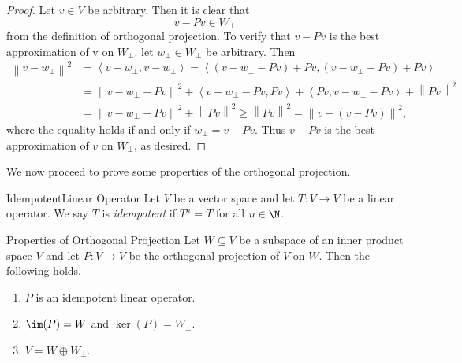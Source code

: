 \documentclass[linearalgebraII]{subfiles}
\begin{document}
    \begin{proof}
        Let $v\in V$ be arbitrary. Then it is clear that
        \begin{equation*}
            v - Pv \in W_\perp 
        \end{equation*}
        from the definition of orthogonal projection. To verify that $v-Pv$ is the best approximation of v on $W_\perp$. let $w_\perp\in W_\perp$ be arbitrary. Then
        \begin{align*}
            \left\lVert v-w_\perp\right\rVert ^2 & = \left\langle v-w_\perp, v-w_\perp\right\rangle = \left\langle \left( v-w_\perp-Pv \right) + Pv, \left( v-w_\perp-Pv \right) + Pv\right\rangle \\
                                                 & = \left\lVert v-w_\perp-Pv\right\rVert ^2 + \left\langle v-w_\perp-Pv, Pv\right\rangle + \left\langle Pv, v-w_\perp-Pv\right\rangle + \left\lVert Pv\right\rVert ^2 \\
                                                 & = \left\lVert v-w_\perp-Pv\right\rVert ^2 + \left\lVert Pv\right\rVert ^2 \geq \left\lVert Pv\right\rVert ^2 = \left\lVert v-\left( v-Pv \right) \right\rVert ^2,
        \end{align*} 
        where the equality holds if and only if $w_\perp = v - Pv$. Thus $v-Pv$ is the best approximation of $v$ on $W_\perp$, as desired.
    \end{proof}

    \begin{remark}
        We now proceed to prove some properties of the orthogonal projection.
    \end{remark}

    \begin{definition}{Idempotent}{Linear Operator}
        Let $V$ be a vector space and let $T:V\to V$ be a linear operator. We say $T$ is \emph{idempotent} if $T^n=T$ for all $n\in\N$.
    \end{definition}

    \begin{prop}{Properties of Orthogonal Projection}
        Let $W\subseteq V$ be a subspace of an inner product space $V$ and let $P:V\to V$ be the orthogonal projection of $V$ on $W$. Then the following holds.
        \begin{enumerate}
            \item $P$ is an idempotent linear operator.
            \item $\im(P) = W$ and $\ker(P) = W_\perp$.
            \item $V = W\oplus W_\perp$.
        \end{enumerate}
    \end{prop}
\end{document}
